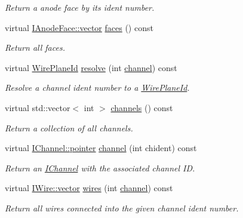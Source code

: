 \begin{DoxyCompactItemize}
\begin{DoxyCompactList}\small\item\em Return a anode face by its ident number. \end{DoxyCompactList}\item 
virtual \hyperlink{class_wire_cell_1_1_i_component_a18978d88ce697af5941655a89660fd4e}{I\+Anode\+Face\+::vector} \hyperlink{class_wire_cell_1_1_gen_1_1_anode_plane_ad25ce7beb274de6570cbb104a1a67702}{faces} () const
\begin{DoxyCompactList}\small\item\em Return all faces. \end{DoxyCompactList}\item 
virtual \hyperlink{class_wire_cell_1_1_wire_plane_id}{Wire\+Plane\+Id} \hyperlink{class_wire_cell_1_1_gen_1_1_anode_plane_abfe29b697f36910a6b7a08c9e4b984bd}{resolve} (int \hyperlink{class_wire_cell_1_1_gen_1_1_anode_plane_ae5d1df06d19a616c9d0c46a0b74f7c81}{channel}) const
\begin{DoxyCompactList}\small\item\em Resolve a channel ident number to a \hyperlink{class_wire_cell_1_1_wire_plane_id}{Wire\+Plane\+Id}. \end{DoxyCompactList}\item 
virtual std\+::vector$<$ int $>$ \hyperlink{class_wire_cell_1_1_gen_1_1_anode_plane_ad934104bec0191d14920a1ef01cc8f00}{channels} () const
\begin{DoxyCompactList}\small\item\em Return a collection of all channels. \end{DoxyCompactList}\item 
virtual \hyperlink{class_wire_cell_1_1_i_data_aff870b3ae8333cf9265941eef62498bc}{I\+Channel\+::pointer} \hyperlink{class_wire_cell_1_1_gen_1_1_anode_plane_ae5d1df06d19a616c9d0c46a0b74f7c81}{channel} (int chident) const
\begin{DoxyCompactList}\small\item\em Return an \hyperlink{class_wire_cell_1_1_i_channel}{I\+Channel} with the associated channel ID. \end{DoxyCompactList}\item 
virtual \hyperlink{class_wire_cell_1_1_i_data_ae1a9f863380499bb43f39fabb6276660}{I\+Wire\+::vector} \hyperlink{class_wire_cell_1_1_gen_1_1_anode_plane_ad16d32c787a7ee9ea8c6c556bbab2e4f}{wires} (int \hyperlink{class_wire_cell_1_1_gen_1_1_anode_plane_ae5d1df06d19a616c9d0c46a0b74f7c81}{channel}) const
\begin{DoxyCompactList}\small\item\em Return all wires connected into the given channel ident number. \end{DoxyCompactList}\end{DoxyCompactItemize}
